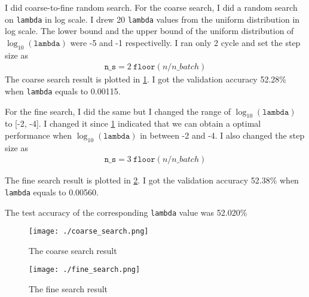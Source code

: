 \documentclass[12pt]{article}
\newenvironment{question}[2][Question]{\begin{trivlist}
\kern10pt
\item[\hskip \labelsep {\bfseries #1}\hskip \labelsep {\bfseries #2.}]}{\end{trivlist}}
\begin{document}
\begin{question}{iv}
    I did coarse-to-fine random search.
    For the coarse search, I did a random search on \texttt{lambda} in log scale.
    I drew 20 \texttt{lambda} values from the uniform distribution in log scale.
    The lower bound and the upper bound of the uniform distribution of $\log_{10}(\texttt{lambda})$
    were -5 and -1 respectivelly. I ran only 2 cycle and set the step size as
    \begin{align*}
        \texttt{n\_s} = 2 ~ \texttt{floor}(n / n\_batch)
    \end{align*}
    The coarse search result is plotted in \cref{plt:coarse_search}.
    I got the validation accuracy 52.28\% when \texttt{lambda} equals to 0.00115.

    For the fine search, I did the same but I changed the range of
    $\log_{10}(\texttt{lambda})$ to [-2, -4]. I changed it since
    \cref{plt:coarse_search} indicated that we can obtain a optimal performance
    when $\log_{10}(\texttt{lambda})$ in between -2 and -4.
    I also changed the step size as
    \begin{align*}
        \texttt{n\_s} = 3 ~ \texttt{floor}(n / n\_batch)
    \end{align*}

    The fine search result is plotted in \cref{plt:fine_search}.
    I got the validation accuracy 52.38\% when \texttt{lambda} equals to 0.00560.

    The test accuracy of the corresponding \texttt{lambda} value was 52.020\%

    \begin{figure}[h]
        \centering
        \texttt{[image: ./coarse\_search.png]}
        \caption{The coarse search result}
        \label{plt:coarse_search}
    \end{figure}

    \begin{figure}[h]
        \centering
        \texttt{[image: ./fine\_search.png]}
        \caption{The fine search result}
        \label{plt:fine_search}
    \end{figure}
\end{question}
\end{document}
